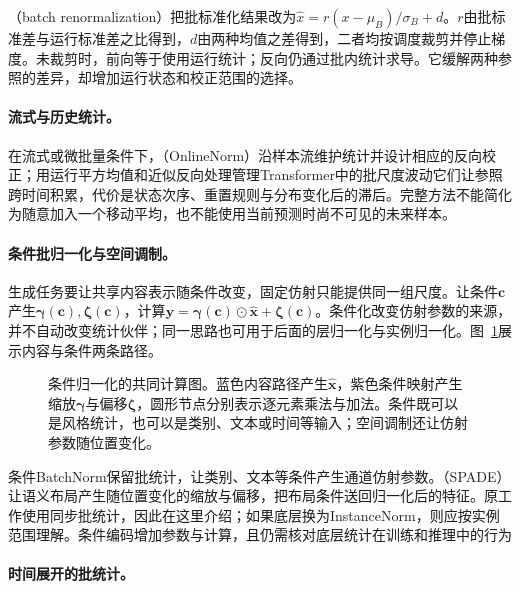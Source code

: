 （batch renormalization）把批标准化结果改为$\hat x=r(x-\mu_B)/\sigma_B+d$。$r$由批标准差与运行标准差之比得到，$d$由两种均值之差得到，二者均按调度裁剪并停止梯度。未裁剪时，前向等于使用运行统计；反向仍通过批内统计求导。它缓解两种参照的差异，却增加运行状态和校正范围的选择。

\paragraph{流式与历史统计。}

在流式或微批量条件下，（OnlineNorm）沿样本流维护统计并设计相应的反向校正；用运行平方均值和近似反向处理管理Transformer中的批尺度波动它们让参照跨时间积累，代价是状态次序、重置规则与分布变化后的滞后。完整方法不能简化为随意加入一个移动平均，也不能使用当前预测时尚不可见的未来样本。

\paragraph{条件批归一化与空间调制。}

生成任务要让共享内容表示随条件改变，固定仿射只能提供同一组尺度。让条件$\bm c$产生$\bm\gamma(\bm c),\bm\zeta(\bm c)$，计算$\bm y=\bm\gamma(\bm c)\odot\hat{\bm x}+\bm\zeta(\bm c)$。条件化改变仿射参数的来源，并不自动改变统计伙伴；同一思路也可用于后面的层归一化与实例归一化。图~\ref{fig:training-conditional-norm}展示内容与条件两条路径。
\begin{figure}[htbp]
  \centering
  
  \caption{条件归一化的共同计算图。蓝色内容路径产生$\hat{\bm x}$，紫色条件映射产生缩放$\bm\gamma$与偏移$\bm\zeta$，圆形节点分别表示逐元素乘法与加法。条件既可以是风格统计，也可以是类别、文本或时间等输入；空间调制还让仿射参数随位置变化。}
  \label{fig:training-conditional-norm}
\end{figure}
\FloatBarrier

条件BatchNorm保留批统计，让类别、文本等条件产生通道仿射参数。（SPADE）让语义布局产生随位置变化的缩放与偏移，把布局条件送回归一化后的特征。原工作使用同步批统计，因此在这里介绍；如果底层换为InstanceNorm，则应按实例范围理解。条件编码增加参数与计算，且仍需核对底层统计在训练和推理中的行为

\paragraph{时间展开的批统计。}

